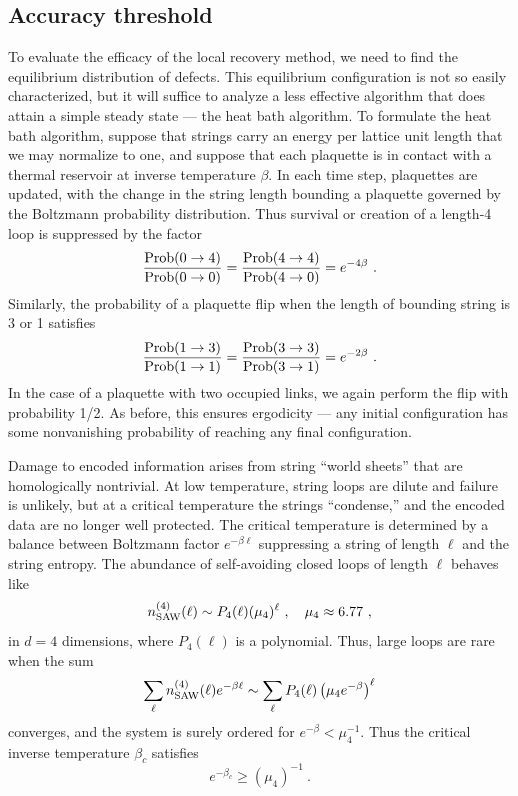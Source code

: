 \subsection{Accuracy threshold}
To evaluate the efficacy of the local recovery method, we need to find
the equilibrium distribution of defects. This equilibrium configuration
is not so easily characterized, but it will suffice to analyze a less effective
algorithm that does attain a simple steady state --- the heat bath algorithm.
To formulate the heat bath algorithm, suppose that strings carry an energy per
lattice unit length that we may normalize to one, and suppose that each
plaquette is in contact with a thermal reservoir at inverse temperature
$\beta$. In each time step, plaquettes are updated, with the change in the
string length bounding a plaquette governed by the Boltzmann probability
distribution.  Thus survival or creation of a length-4 loop is suppressed by
the factor
\begin{equation}
\label{boltz_04}
{{\rm Prob}(0\to4)\over {\rm Prob}(0\to 0)}= {{\rm Prob}(4\to 4)\over {\rm
Prob}(4\to 0)}= e^{-4\beta}~.
\end{equation}
Similarly, the probability of a plaquette flip when the length of bounding
string is 3 or 1 satisfies
\begin{equation}
\label{boltz_13}
{{\rm Prob}(1\to3)\over {\rm Prob}(1\to 1)}= {{\rm Prob}(3\to 3)\over {\rm
Prob}(3\to 1)}= e^{-2\beta}~.
\end{equation}
In the case of a plaquette with two occupied links, we again perform the flip
with probability 1/2. As before, this ensures ergodicity --- any initial
configuration has some nonvanishing probability of reaching any final
configuration.

Damage to encoded information arises from string ``world sheets'' that are
homologically nontrivial.  At low temperature, string loops are dilute and
failure is unlikely, but at a critical temperature the strings ``condense,''
and the encoded data are no longer well protected.  The critical temperature is
determined by a balance between Boltzmann factor $e^{-\beta \ell}$ suppressing a
string of length $\ell$ and the string entropy. The abundance of self-avoiding
closed loops of length $\ell$ behaves like \cite{madras}
\begin{equation}
n_{\rm SAW}^{(4)}(\ell)\sim P_4(\ell)(\mu_4)^\ell~,\quad \mu_4 \approx 6.77~,
\end{equation}
in $d=4$ dimensions, where $P_4(\ell)$ is a polynomial. Thus, large loops are rare
when the sum
\begin{equation}
\sum_\ell n_{\rm SAW}^{(4)}(\ell) e^{-\beta \ell} \sim \sum_\ell P_4(\ell) \left(\mu_4
e^{-\beta}\right)^\ell
\end{equation}
converges, and the system is surely ordered for $e^{-\beta}<\mu_4^{-1}$. Thus the critical inverse temperature $\beta_c$ satisfies
\begin{equation}
e^{-\beta_c}\ge (\mu_4)^{-1}~.
\label{critical_beta}
\end{equation}


